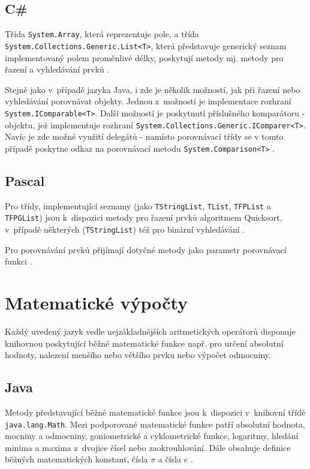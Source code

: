 \documentclass[onepage, a4paper, 12pt]{bakalarka}
\begin{document}
\subsection{C\#}
Třída \texttt{System.Array}, která reprezentuje pole, a třída \texttt{System.Collections\-.Generic.List<T>}, která představuje generický seznam implementovaný polem proměnlivé délky, poskytují metody mj. metody pro řazení a vyhledávání prvků \cite{cs-guide-array, cs-guide-list}.\par
Stejně jako v~případě jazyka Java, i zde je několik možností, jak při řazení nebo vyhledávání porovnávat objekty. Jednou z~možností je implementace rozhraní \texttt{System.IComparable<T>}. Další možností je poskytnutí příslušného komparátoru - objektu, jež implementuje rozhraní \texttt{System.Collections\-.Generic.IComparer<T>}. Navíc je zde možné využití delegátů - namísto porovnávací třídy se v tomto případě poskytne odkaz na porovnávací metodu \texttt{System.Comparison<T>} \cite{cs-guide-icomparable, cs-guide-icomparer, cs-guide-comparison}.

\subsection{Pascal}
Pro třídy, implementující seznamy (jako \texttt{TStringList}, \texttt{TList}, \texttt{TFPList} a \texttt{TFPGList}) jsou k~dispozici metody pro řazení prvků algoritmem Quicksort, v~případě některých (\texttt{TStringList}) též pro binární vyhledávání \cite{pas-guide-tlistsort, pas-guide-tfplistsort}.\par
Pro porovnávání prvků přijímají dotyčné metody jako parametr porovnávací funkci \cite{pas-guide-tlistsortcompare}.

\section{Matematické výpočty}
Každý uvedený jazyk vedle nejzákladnějších aritmetických operátorů disponuje knihovnou poskytující běžné matematické funkce např. pro určení absolutní hodnoty, nalezení menšího nebo většího prvku nebo výpočet odmocniny.

\subsection{Java}
Metody představující běžné matematické funkce jsou k~dispozici v~knihovní třídě \texttt{java.lang.Math}. Mezi podporované matematické funkce patří absolutní hodnota, mocniny a odmocniny, goniometrické a cyklometrické funkce, logaritmy, hledání minima a maxima z~dvojice čísel nebo zaokrouhlování. Dále obsahuje definice běžných matematických konstant, čísla $\pi$ a čísla $e$ \cite{java-guide-math}.
\end{document}
